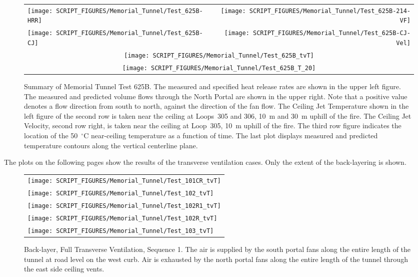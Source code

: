 \begin{figure}[p]
\begin{tabular*}{\textwidth}{l@{\extracolsep{\fill}}r}
\texttt{[image: SCRIPT\_FIGURES/Memorial\_Tunnel/Test\_625B-HRR]} &
\texttt{[image: SCRIPT\_FIGURES/Memorial\_Tunnel/Test\_625B-214-VF]} \\
\texttt{[image: SCRIPT\_FIGURES/Memorial\_Tunnel/Test\_625B-CJ]} &
\texttt{[image: SCRIPT\_FIGURES/Memorial\_Tunnel/Test\_625B-CJ-Vel]} \\
\multicolumn{2}{c}{\texttt{[image: SCRIPT\_FIGURES/Memorial\_Tunnel/Test\_625B\_tvT]}} \\
\multicolumn{2}{c}{\texttt{[image: SCRIPT\_FIGURES/Memorial\_Tunnel/Test\_625B\_T\_20]}}
\end{tabular*}
\caption[Summary of Memorial Tunnel Test 625B]{Summary of Memorial Tunnel Test 625B. The measured and specified heat release rates are shown in the upper left figure. The measured and predicted volume flows through the North Portal are shown in the upper right. Note that a positive value denotes a flow direction from south to north, against the direction of the fan flow. The Ceiling Jet Temperature shown in the left figure of the second row is taken near the ceiling at Loops~305 and 306, 10~m and 30~m uphill of the fire. The Ceiling Jet Velocity, second row right, is taken near the ceiling at Loop~305, 10~m uphill of the fire. The third row figure indicates the location of the 50~$^\circ$C near-ceiling temperature as a function of time. The last plot displays measured and predicted temperature contours along the vertical centerline plane.}
\label{Memorial_Tunnel_625B}
\end{figure}

\FloatBarrier

The plots on the following pages show the results of the transverse ventilation cases. Only the extent of the back-layering is shown.

\newpage


\begin{figure}[p]
\begin{tabular*}{\textwidth}{l}
\texttt{[image: SCRIPT\_FIGURES/Memorial\_Tunnel/Test\_101CR\_tvT]} \\
\texttt{[image: SCRIPT\_FIGURES/Memorial\_Tunnel/Test\_102\_tvT]} \\
\texttt{[image: SCRIPT\_FIGURES/Memorial\_Tunnel/Test\_102R1\_tvT]} \\
\texttt{[image: SCRIPT\_FIGURES/Memorial\_Tunnel/Test\_102R\_tvT]} \\
\texttt{[image: SCRIPT\_FIGURES/Memorial\_Tunnel/Test\_103\_tvT]}
\end{tabular*}
\caption[Back-layer, Full Transverse Ventilation, Sequence 1]{Back-layer, Full Transverse Ventilation, Sequence 1. The air is supplied by the south portal fans along the entire length of the tunnel at road level on the west curb. Air is exhausted by the north portal fans along the entire length of the tunnel through the east side ceiling vents.}
\label{Memorial_Tunnel_Seq_1a}
\end{figure}

